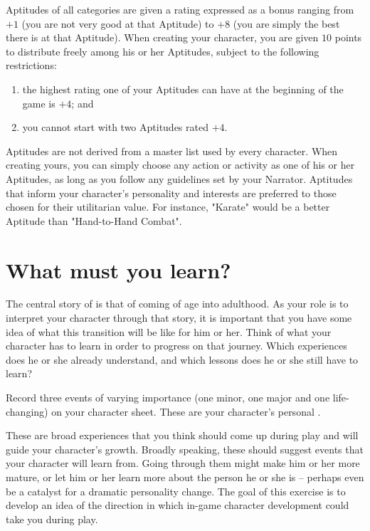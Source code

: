 Aptitudes of all categories are given a rating expressed as a bonus ranging from $+1$ (you are not very good
at that Aptitude) to $+8$ (you are simply the best there is at that Aptitude). When creating your character, you
are given $10$ points to distribute freely among his or her Aptitudes, subject to the following restrictions:
\begin{enumerate}
\item the highest rating one of your Aptitudes can have at the beginning of the game is $+4$; and
\item you cannot start with two Aptitudes rated $+4$.
\end{enumerate}

Aptitudes are not derived from a master list used by every character. When creating yours, you can simply
choose any action or activity as one of his or her Aptitudes, as long as you follow any guidelines set by
your Narrator. Aptitudes that inform your character's personality and interests are preferred to those chosen
for their utilitarian value. For instance, "Karate" would be a better Aptitude than "Hand-to-Hand Combat".

\section{What must you learn?}

The central story of \ParadoxSpaceRPG{} is that of coming of age into adulthood. As your role is to interpret
your character through that story, it is important that you have some idea of what this transition will be like
for him or her.  Think of what your character has to learn in order to progress on that journey. Which
experiences does he or she already understand, and which lessons does he or she still have to learn?

Record three events of varying importance (one minor, one major and one life-changing) on your character sheet.
These are your character's personal .

These are broad experiences that you think should come up during play and will guide your character's growth.
Broadly speaking, these should suggest events that your character will learn from. Going through them might
make him or her more mature, or let him or her learn more about the person he or she is -- perhaps even be
a catalyst for a dramatic personality change. The goal of this exercise is to develop an idea of the direction
in which in-game character development could take you during play.

